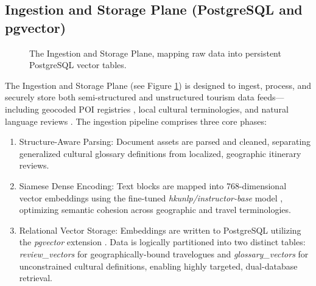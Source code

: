 \documentclass{ieeeaccess}
\begin{document}
\subsection{Ingestion and Storage Plane (PostgreSQL and pgvector)}
\begin{figure}[htbp]
\centering
{}
\caption{The Ingestion and Storage Plane, mapping raw data into persistent PostgreSQL vector tables.}
\label{fig:ingestion_plane}
\end{figure}

The Ingestion and Storage Plane (see Figure \ref{fig:ingestion_plane}) is designed to ingest, process, and securely store both semi-structured and unstructured tourism data feeds—including geocoded POI registries \cite{ni-tprag-2025}, local cultural terminologies, and natural language reviews \cite{tourllm-2024}. The ingestion pipeline comprises three core phases:
\begin{enumerate}
    \item Structure-Aware Parsing: Document assets are parsed and cleaned, separating generalized cultural glossary definitions from localized, geographic itinerary reviews.
    \item Siamese Dense Encoding: Text blocks are mapped into 768-dimensional vector embeddings using the fine-tuned \emph{hkunlp/instructor-base} model \cite{reimers-sbert-2019}, optimizing semantic cohesion across geographic and travel terminologies.
    \item Relational Vector Storage: Embeddings are written to PostgreSQL utilizing the \emph{pgvector} extension \cite{pan-vector-survey-2024}. Data is logically partitioned into two distinct tables: \emph{review\_vectors} for geographically-bound travelogues and \emph{glossary\_vectors} for unconstrained cultural definitions, enabling highly targeted, dual-database retrieval.
\end{enumerate}
\end{document}
